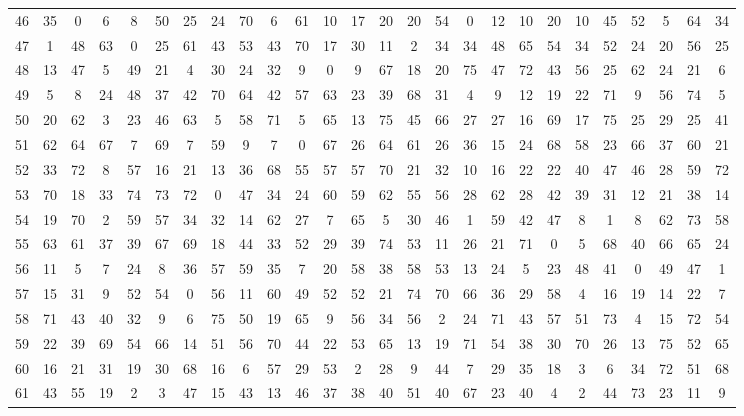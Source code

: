 \begin{table}
\begin{tabular}{c c c c c c c c c c c c c c c c c c c c c c c c c c }
46 & 35 & 0 & 6 & 8 & 50 & 25 & 24 & 70 & 6 & 61 & 10 & 17 & 20 & 20 & 54 & 0 & 12 & 10 & 20 & 10 & 45 & 52 & 5 & 64 & 34 \\
47 & 1 & 48 & 63 & 0 & 25 & 61 & 43 & 53 & 43 & 70 & 17 & 30 & 11 & 2 & 34 & 34 & 48 & 65 & 54 & 34 & 52 & 24 & 20 & 56 & 25 \\
48 & 13 & 47 & 5 & 49 & 21 & 4 & 30 & 24 & 32 & 9 & 0 & 9 & 67 & 18 & 20 & 75 & 47 & 72 & 43 & 56 & 25 & 62 & 24 & 21 & 6 \\
49 & 5 & 8 & 24 & 48 & 37 & 42 & 70 & 64 & 42 & 57 & 63 & 23 & 39 & 68 & 31 & 4 & 9 & 12 & 19 & 22 & 71 & 9 & 56 & 74 & 5 \\
50 & 20 & 62 & 3 & 23 & 46 & 63 & 5 & 58 & 71 & 5 & 65 & 13 & 75 & 45 & 66 & 27 & 27 & 16 & 69 & 17 & 75 & 25 & 29 & 25 & 41 \\
51 & 62 & 64 & 67 & 7 & 69 & 7 & 59 & 9 & 7 & 0 & 67 & 26 & 64 & 61 & 26 & 36 & 15 & 24 & 68 & 58 & 23 & 66 & 37 & 60 & 21 \\
52 & 33 & 72 & 8 & 57 & 16 & 21 & 13 & 36 & 68 & 55 & 57 & 57 & 70 & 21 & 32 & 10 & 16 & 22 & 22 & 40 & 47 & 46 & 28 & 59 & 72 \\
53 & 70 & 18 & 33 & 74 & 73 & 72 & 0 & 47 & 34 & 24 & 60 & 59 & 62 & 55 & 56 & 28 & 62 & 28 & 42 & 39 & 31 & 12 & 21 & 38 & 14 \\
54 & 19 & 70 & 2 & 59 & 57 & 34 & 32 & 14 & 62 & 27 & 7 & 65 & 5 & 30 & 46 & 1 & 59 & 42 & 47 & 8 & 1 & 8 & 62 & 73 & 58 \\
55 & 63 & 61 & 37 & 39 & 67 & 69 & 18 & 44 & 33 & 52 & 29 & 39 & 74 & 53 & 11 & 26 & 21 & 71 & 0 & 5 & 68 & 40 & 66 & 65 & 24 \\
56 & 11 & 5 & 7 & 24 & 8 & 36 & 57 & 59 & 35 & 7 & 20 & 58 & 38 & 58 & 53 & 13 & 24 & 5 & 23 & 48 & 41 & 0 & 49 & 47 & 1 \\
57 & 15 & 31 & 9 & 52 & 54 & 0 & 56 & 11 & 60 & 49 & 52 & 52 & 21 & 74 & 70 & 66 & 36 & 29 & 58 & 4 & 16 & 19 & 14 & 22 & 7 \\
58 & 71 & 43 & 40 & 32 & 9 & 6 & 75 & 50 & 19 & 65 & 9 & 56 & 34 & 56 & 2 & 24 & 71 & 43 & 57 & 51 & 73 & 4 & 15 & 72 & 54 \\
59 & 22 & 39 & 69 & 54 & 66 & 14 & 51 & 56 & 70 & 44 & 22 & 53 & 65 & 13 & 19 & 71 & 54 & 38 & 30 & 70 & 26 & 13 & 75 & 52 & 65 \\
60 & 16 & 21 & 31 & 19 & 30 & 68 & 16 & 6 & 57 & 29 & 53 & 2 & 28 & 9 & 44 & 7 & 29 & 35 & 18 & 3 & 6 & 34 & 72 & 51 & 68 \\
61 & 43 & 55 & 19 & 2 & 3 & 47 & 15 & 43 & 13 & 46 & 37 & 38 & 40 & 51 & 40 & 67 & 23 & 40 & 4 & 2 & 44 & 73 & 23 & 11 & 9 \\

\end{tabular}
\end{table}

